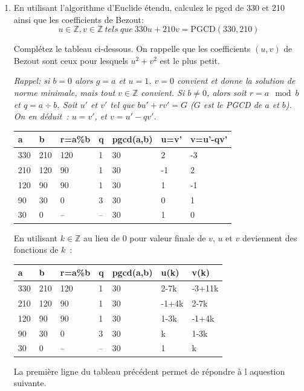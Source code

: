 \documentclass[11pt]{article}
\def\Z{\mathbb Z}
\begin{document}
\begin{enumerate}
\item  En utilisant l'algorithme d'Euclide étendu, calculez le pgcd de 330 et 210 ainsi que les coefficients de Bezout:
$$u\in \Z, v\in \Z \ tels \ que \ 330u+210v=\mbox{PGCD}(330, 210)$$

Complétez le tableau ci-dessous. On rappelle que les coefficients $(u, v)$
de Bezout sont ceux pour lesquels $u^2 + v^2$ est le plus petit.

{\it 
Rappel: si $b=0$ alors $g=a$ et $u=1$. $v=0$ convient et donne la solution de norme minimale, mais tout $v\in \Z$ convient.
Si $b\neq 0$, alors soit $r=a\mod b$ et $q=a\div b$. Soit $u'$ et $v'$ tel que
$bu'+rv'=G$ ($G$ est le PGCD de $a$ et $b$). On en déduit~: $u=v'$, et $v=u'-qv'$.

\medskip
\begin{tabular}{|p{1.5cm}|p{1.5cm}|p{1.5cm}|p{1.5cm}|p{1.5cm}|p{1.5cm}|p{1.5cm}|}
\hline a & b & r=a\%b & q & pgcd(a,b) & u=v' & v=u'-qv'\\ 
\hline 
\hline  
330   &  210   & 120  & 1   & 30  & 2 & -3\\
\hline  
210 & 120   & 90  & 1 & 30  & -1 & 2 \\
\hline 
120 & 90   & 90  & 1 & 30  & 1  & -1 \\
\hline 
90 &  30  &  0 &  3  & 30  &  0 & 1  \\
\hline  
30 &  0  & --   & --    & 30  &  1 & 0  \\
\hline
\end{tabular}

En utilisant $k\in\Z$ au lieu de 0  pour valeur finale de $v$,  $u$ et $v$ deviennent des fonctions de $k$~:

\begin{tabular}{|p{1.5cm}|p{1.5cm}|p{1.5cm}|p{1.5cm}|p{1.5cm}|p{1.5cm}|p{1.5cm}|}
\hline a & b & r=a\%b & q & pgcd(a,b) & u(k) & v(k)\\
\hline
\hline  
330   &  210   & 120  & 1   & 30  & 2-7k & -3+11k\\
\hline  
210 & 120   & 90  & 1 & 30  & -1+4k & 2-7k \\
\hline
120 & 90   & 90  & 1 & 30  & 1-3k  & -1+4k \\
\hline 
90 &  30  &  0 &  3  & 30  &  k & 1-3k  \\
\hline  
30 &  0  & --   & --    & 30  &  1 & k  \\
\hline
\end{tabular}

La première ligne du tableau précédent permet de répondre à l aquestion suivante.
}


\end{enumerate}
\end{document}
